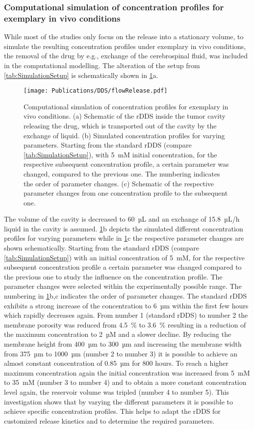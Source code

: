 \subsubsection{Computational simulation of concentration profiles for exemplary in vivo conditions}
While most of the studies only focus on the release into a stationary volume, to simulate the resulting concentration profiles under exemplary in vivo conditions, the removal of the drug by e.g., exchange of the cerebrospinal fluid, was included in the computational modelling. The alteration of the setup from \cref{tab:SimulationSetup} is schematically shown in \cref{fig:flowRelease}a. 
\begin{figure}[h!]
  \centering
  \texttt{[image: Publications/DDS/flowRelease.pdf]}
  \caption{Computational simulation of concentration profiles for exemplary in vivo conditions. (a) Schematic of the rDDS inside the tumor cavity releasing the drug, which is transported out of the cavity by the exchange of liquid. (b) Simulated concentration profiles for varying parameters. Starting from the standard rDDS (compare \cref{tab:SimulationSetup}), with 5~mM initial concentration, for the respective subsequent concentration profile, a certain parameter was changed, compared to the previous one. The numbering indicates the order of parameter changes. (c) Schematic of the respective parameter changes from one concentration profile to the subsequent one.}
  \label{fig:flowRelease}
\end{figure}
The volume of the cavity is decreased to 60~µL and an exchange of 15.8~µL/h liquid in the cavity is assumed. \cref{fig:flowRelease}b depicts the simulated different concentration profiles for varying parameters while in \cref{fig:flowRelease}c the respective parameter changes are shown schematically. Starting from the standard rDDS (compare \cref{tab:SimulationSetup}) with an initial concentration of 5~mM, for the respective subsequent concentration profile a certain parameter was changed compared to the previous one to study the influence on the concentration profile. The parameter changes were selected within the experimentally possible range. The numbering in \cref{fig:flowRelease}b,c indicates the order of parameter changes. The standard rDDS exhibits a strong increase of the concentration to 6~µm within the first few hours which rapidly decreases again. From number 1 (standard rDDS) to number 2 the membrane porosity was reduced from 4.5~\% to 3.6~\% resulting in a reduction of the maximum concentration to 2~µM and a slower decline. By reducing the membrane height from 400~µm to 300~µm and increasing the membrane width from 375~µm to 1000~µm (number 2 to number 3) it is possible to achieve an almost constant concentration of 0.85~µm for 800 hours. To reach a higher maximum concentration again the initial concentration was increased from 5~mM to 35~mM (number 3 to number 4) and to obtain a more constant concentration level again, the reservoir volume was tripled (number 4 to number 5). This investigation shows that by varying the different parameters it is possible to achieve specific concentration profiles. This helps to adapt the rDDS for customized release kinetics and to determine the required parameters. 

